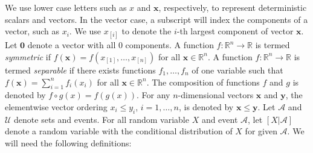 









We  use lower case letters such as $x$ and $\bm{x}$, respectively, to represent deterministic scalars and vectors. In the vector case, a subscript will index the components of a vector, such as $x_i$.
We use $x_{[i]}$ %
to denote the $i$-th largest %
component of vector $\bm{x}$. Let $\bm 0$ denote   a vector with all 0 components.
A function $f: \mathbb{R}^n\rightarrow \mathbb{R}$ is termed \emph{symmetric} if $f(\bm{x})= f(x_{[1]},\ldots, x_{[n]})$ for all $\bm{x} \in \mathbb{R}^n$. A function $f: \mathbb{R}^n\rightarrow \mathbb{R}$ is termed \emph{separable} if there exists functions $f_1,\ldots,f_n$ of one variable such that $f(\bm{x}) = \sum_{i=1}^n f_i(x_i)$ for all $\bm{x} \in \mathbb{R}^n$. 
The composition of functions $f$ and $g$ is denoted by $f \circ g( x) = f(g ( x))$. 
 For any $n$-dimensional vectors $\bm{x}$ and $\bm{y}$, the elementwise vector ordering $x_i\leq y_i$, $i=1,\ldots,n$, is denoted by $\bm{x} \leq \bm{y}$. 
Let $\mathcal{A}$ 
and $\mathcal{U}$ 
denote sets and events. 
For all random variable ${X}$ and event $\mathcal{A}$, let $[{X}|\mathcal{A}]$ denote a random variable with the conditional distribution of ${X}$ for given $\mathcal{A}$. We will need the following definitions: 




